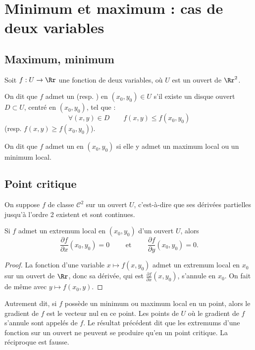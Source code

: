 \documentclass[11pt, class=report,crop=false]{standalone}
\begin{document}
\section{Minimum et maximum : cas de deux variables}

\subsection{Maximum, minimum}
Soit $f:U\to \Rr$ une fonction de deux variables, o\`u $U$ est un ouvert de $\Rr^2$.

\begin{definition}
	On dit que $f$ admet un  (resp. ) en $(x_0,y_0)\in U$ s'il existe un disque ouvert $D\subset U$, centré en $(x_0,y_0)$, tel que :
    $$\forall (x,y)\in D \qquad f(x,y) \le f(x_0,y_0)$$
     (resp. $f(x,y) \ge f(x_0,y_0)$).

On dit que $f$ admet un  en $(x_0,y_0)$ si elle y admet un maximum local ou un minimum local.
\end{definition}


\subsection{Point critique}

On suppose $f$ de classe $\mathcal{C}^2$ sur un ouvert $U$, c'est-à-dire que ses dérivées partielles jusqu'à l'ordre 2 existent et sont continues.


\begin{proposition}
	Si $f$ admet un extremum local en $(x_0,y_0)$ d'un ouvert $U$, alors $$\frac{\partial f}{\partial x}(x_0,y_0) = 0 \qquad \text{ et  } \qquad \frac{\partial f}{\partial y} (x_0,y_0) = 0.$$
\end{proposition}

\begin{proof}
    La fonction d'une variable $x\mapsto f(x,y_0)$ admet un extremum local en $x_0$ sur un ouvert de $\Rr$, donc sa dérivée, qui est $\frac{\partial f}{\partial x}  (x,y_0)$, s'annule en $x_0$. On fait de même avec $y\mapsto f(x_0,y)$.
\end{proof}

Autrement dit, si $f$ possède un minimum ou maximum local en un point, alors le gradient de $f$ est le vecteur nul en ce point.
Les points de $U$ où le gradient de $f$ s'annule sont appelés  de $f$. Le résultat précédent dit que les extremums d'une fonction sur un ouvert ne peuvent se produire qu'en un point critique. La réciproque est fausse.
\end{document}
